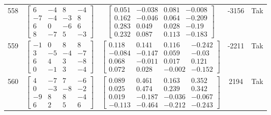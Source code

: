 \documentclass[a4paper,12pt]{article}
\begin{document}
\begin{tabular}{c c c c c}
558
&
$\begin{bmatrix} 6 & -4 & 8 & -4 \\ -7 & -4 & -3 & 8 \\ 6 & 0 & -6 & 6 \\ 8 & -7 & 5 & -3 \end{bmatrix}$
&
$\begin{bmatrix} 0.051 & -0.038 & 0.081 & -0.008 \\ 0.162 & -0.046 & 0.064 & -0.209 \\ 0.283 & 0.049 & 0.028 & -0.19 \\ 0.232 & 0.087 & 0.113 & -0.183 \end{bmatrix}$
&
-3156
&
Tak
\\
559
&
$\begin{bmatrix} -1 & 0 & 8 & 8 \\ 3 & -5 & -4 & -7 \\ 6 & 4 & 3 & -8 \\ 0 & -1 & 3 & -4 \end{bmatrix}$
&
$\begin{bmatrix} 0.118 & 0.141 & 0.116 & -0.242 \\ -0.084 & -0.147 & 0.059 & -0.03 \\ 0.068 & -0.011 & 0.017 & 0.121 \\ 0.072 & 0.028 & -0.002 & -0.152 \end{bmatrix}$
&
-2211
&
Tak
\\
560
&
$\begin{bmatrix} 4 & -7 & 7 & -6 \\ 0 & -3 & -8 & -2 \\ -9 & 8 & 8 & -4 \\ 6 & 2 & 5 & 6 \end{bmatrix}$
&
$\begin{bmatrix} 0.089 & 0.461 & 0.163 & 0.352 \\ 0.025 & 0.474 & 0.239 & 0.342 \\ 0.019 & -0.187 & -0.036 & -0.067 \\ -0.113 & -0.464 & -0.212 & -0.243 \end{bmatrix}$
&
2194
&
Tak
\\
\end{tabular} \egroup \newpage
\end{document}
